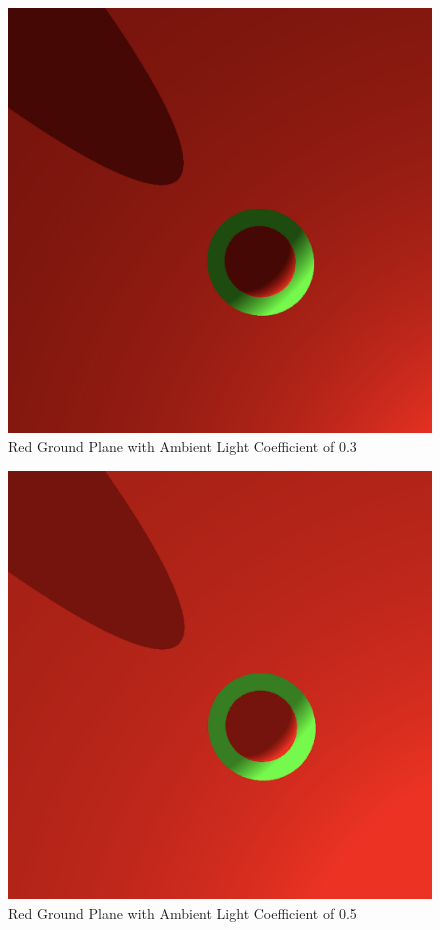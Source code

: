 \documentclass{article}
\begin{document}
\begin{centering}
\begin{figure}[H]
\includegraphics[width=1\textwidth]{./images/red-bg-ambient-03.png}
\caption{Red Ground Plane with Ambient Light Coefficient of 0.3}
\label{fig:gp2}
\end{figure}
\begin{figure}[H]
\includegraphics[width=1\textwidth]{./images/red-bg-ambient-05.png}
\caption{Red Ground Plane with Ambient Light Coefficient of 0.5}
\label{fig:gp3}
\end{figure}
\end{centering}
\end{document}
